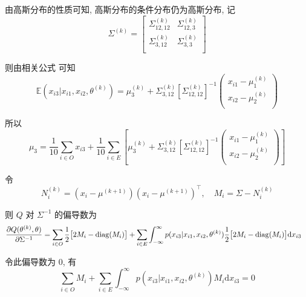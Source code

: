 \documentclass{article}
\begin{document}
由高斯分布的性质可知, 高斯分布的条件分布仍为高斯分布, 记
\begin{equation}
  \Sigma^{(k)}=
  \begin{bmatrix}
    \Sigma_{12,12}^{(k)} & \Sigma_{12,3}^{(k)}\\
    \Sigma_{3,12}^{(k)}  & \Sigma_{3,3}^{(k)} \\
  \end{bmatrix}
\end{equation}

则由相关公式 \cite{b1,b2,b3} 可知
\begin{equation}
  \mathbb{E}(x_{i3}|x_{i1},x_{i2},\theta^{(k)})=\mu_3^{(k)}+\Sigma_{3,12}^{(k)}\left[\Sigma_{12,12}^{(k)}\right]^{-1}
  \begin{pmatrix}
    x_{i1}-\mu_1^{(k)}\\
    x_{i2}-\mu_2^{(k)}\\
  \end{pmatrix}
\end{equation}

所以
\begin{equation}
  \mu_3=\frac{1}{10}\sum_{i\in O}x_{i3}+\frac{1}{10}\sum_{i\in E}\left[\mu_3^{(k)}+\Sigma_{3,12}^{(k)}\left[\Sigma_{12,12}^{(k)}\right]^{-1}
  \begin{pmatrix}
    x_{i1}-\mu_1^{(k)}\\
    x_{i2}-\mu_2^{(k)}\\
  \end{pmatrix}\right]
\end{equation}

令
\begin{equation}
  N_i^{(k)}=(x_i-\mu^{(k+1)})(x_i-\mu^{(k+1)})^{\top},\quad M_i=\Sigma-N_i^{(k)}
\end{equation}

则 $Q$ 对 $\Sigma^{-1}$ 的偏导数为
\begin{equation}
  \begin{aligned}
    \frac{\partial Q(\theta^{(k)},\theta)}{\partial\Sigma^{-1}}
    &=\sum_{i\in O}\frac{1}{2}\big[2M_i-\operatorname{diag}(M_i)\big]+\sum_{i\in E}\int_{-\infty}^\infty p(x_{i3}|x_{i1},x_{i2},\theta^{(k)})\frac{1}{2}\big[2M_i-\operatorname{diag}(M_i)\big]\mathrm{d}x_{i3}
  \end{aligned}
\end{equation}

令此偏导数为 0, 有
\begin{equation}
  \sum_{i\in O}M_i+\sum_{i\in E}\int_{-\infty}^\infty p(x_{i3}|x_{i1},x_{i2},\theta^{(k)})M_i\mathrm{d}x_{i3}=0
\end{equation}
\end{document}
